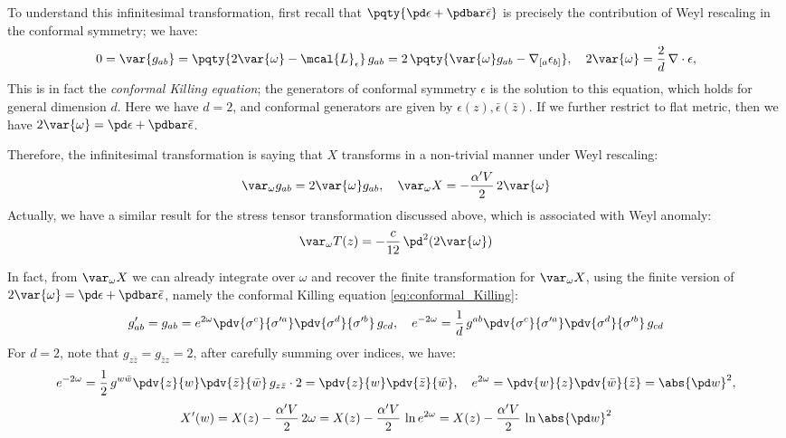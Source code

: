 \documentclass[a4paper
	,10pt
]{article}
\begin{document}
	To understand this infinitesimal transformation, first recall that $
		\pqty{
			\pd\epsilon
			+ \pdbar\bar{\epsilon}
		}
	$ is precisely the contribution of Weyl rescaling in the conformal symmetry; we have:
	\begin{equation}
		0 = \var{g_{ab}}
		= \pqty{2\var{\omega} - \mcal{L}_\epsilon}\,
			g_{ab}
		= 2\,\pqty{
				\var{\omega} g_{ab}
				- \nabla_{[a} \epsilon_{b]}
			},
	\quad
		2\var{\omega}
		= \frac{2}{d}\,\nabla\cdot\epsilon,
	\label{eq:conformal_Killing}
	\end{equation}
	This is in fact the \textit{conformal Killing equation}; the generators of conformal symmetry $\epsilon$ is the solution to this equation, which holds for general dimension $d$. 
	Here we have $d = 2$, and conformal generators are given by $\epsilon(z), \bar{\epsilon}(\bar{z})$. If we further restrict to flat metric, then we have $
		2\var{\omega}
		= \pd\epsilon
			+ \pdbar\bar{\epsilon}
	$. 
	
	Therefore, the infinitesimal transformation is saying that $X$ transforms in a non-trivial manner under Weyl rescaling:
	\begin{equation}
		\var_\omega g_{ab} = 2\var{\omega} g_{ab},
	\quad
		\var_\omega X
		= - \frac{\alpha' V}{2}\, 2\var{\omega}
	\end{equation}
	Actually, we have a similar result for the stress tensor transformation discussed above, which is associated with Weyl anomaly:
	\begin{equation}
		\var_\omega T(z)
		= - \frac{c}{12}\,\pd^2 (2\var{\omega})
	\end{equation}
	
	In fact, from $\var_\omega {X}$ we can already integrate over $\omega$ and recover the finite transformation for $\var_\omega {X}$, using the finite version of $
		2\var{\omega}
		= \pd\epsilon
			+ \pdbar\bar{\epsilon}
	$, namely the conformal Killing equation \eqref{eq:conformal_Killing}:
	\begin{equation}
		g'_{ab}
		= g_{ab}
		= e^{2\omega} \pdv{\sigma^c}{\sigma'^a}
			\pdv{\sigma^d}{\sigma'^b}\,g_{cd},
	\quad
		e^{-2\omega}
		= \frac{1}{d}\,
			g^{ab}
			\pdv{\sigma^c}{\sigma'^a}
			\pdv{\sigma^d}{\sigma'^b}
			\,g_{cd}
	\end{equation}
	For $d = 2$, note that $g_{z\bar{z}} = g_{\bar{z}z} = 2$, after carefully summing over indices, we have:
	\begin{equation}
		e^{-2\omega}
		= \frac{1}{2}\, g^{w\bar{w}}
			\pdv{z}{w}
			\pdv{\bar{z}}{\bar{w}}\,
			g_{z\bar{z}} \cdot 2
		= \pdv{z}{w} \pdv{\bar{z}}{\bar{w}},
	\quad
		e^{2\omega}
		= \pdv{w}{z} \pdv{\bar{w}}{\bar{z}}
		= \abs{\pd w}^2,
	\end{equation}
	\vspace{-.5\baselineskip}
	\begin{equation}
		X'(w)
		= X(z) - \frac{\alpha' V}{2}\, 2\omega
		= X(z) - \frac{\alpha' V}{2}\, \ln e^{2\omega}
		= X(z) - \frac{\alpha' V}{2}\, \ln \abs{\pd w}^2
	\end{equation}
\end{document}
